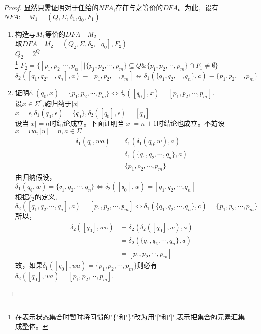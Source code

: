 \begin{proof}
	显然只需证明对于任给的$NFA$,存在与之等价的$DFA$。为此，设有$NFA:\quad M_1=(Q,\Sigma,\delta_1,q_0,F_1)$
	\begin{enumerate}
		\item 构造与$M_1$等价的$DFA\quad M_2$\\
		取$DFA\quad M_2=(Q_2,\Sigma,\delta_2,[q_0],F_2)$\\
		$Q_2=2^Q$\\
		\footnote[1]{在表示状态集合时暂时将习惯的"\{"和"\}"改为用"["和"]",表示把集合的元素汇集成整体。}
		$F_2=\{[p_1,p_2,\cdots,p_m]|\{p_1,p_2,\cdots,p_m\}\subseteq Q \& \{p_1,p_2,\cdots,p_m\}\cap F_1\ne\emptyset\}$\\
		$\delta_2([q_1,q_2,\cdots,q_n],a)=[p_1,p_2,\cdots,p_m] \Leftrightarrow
		\delta_1(\{q_1,q_2,\cdots,q_n\},a)=\{p_1,p_2,\cdots,p_m\}$
		
		\item[\label{delta_2}] 证明$\delta_1(q_0,x)=\{p_1,p_2,\cdots,p_m\}\Leftrightarrow\delta_2([q_0],x)=[p_1,p_2,\cdots,p_m]$.\\
		设$x\in\Sigma^\ast$,施归纳于$|x|$\\
		$x=\epsilon,\delta_1(q_0,\epsilon)=\{q_0\},\delta_2([q_0],\epsilon)=[q_0]$\\
		设当$|x|=n$时结论成立。下面证明当$|x|=n+1$时结论也成立。不妨设$x=wa,|w|=n,a\in\Sigma$
		\begin{align*}
		\delta_1(q_0,wa) &=\delta_1(\delta_1(q_0,w),a)\\
		&= \delta_1(\{q_1,q_2,\cdots,q_n\},a)\\
		&= \{p_1,p_2,\cdots,p_m\}
		\end{align*}
		由归纳假设，\\
		$\delta_1(q_0,w)=\{q_1,q_2,\cdots,q_n\}\Leftrightarrow\delta_2([q_0],w)=[q_1,q_2,\cdots,q_n]$\\
		根据$\delta_2$的定义, \\
		$\delta_2([q_1,q_2,\cdots,q_n],a)=[p_1,p_2,\cdots,p_m]\Leftrightarrow\delta_1(\{q_1,q_2,\cdots,q_n\},a)=\{p_1,p_2,\cdots,p_m\}$\\
		所以，
		\begin{align*}
		\delta_2([q_0],wa) &=\delta_2(\delta_2([q_0],w),a)\\
		&= \delta_2(\{q_1,q_2,\cdots,q_n\},a)\\
		&= [p_1,p_2,\cdots,p_m]
		\end{align*}
		故，如果$\delta_1([q_0],wa)=\{p_1,p_2,\cdots,p_m\}$则必有$\delta_2([q_0],wa)=[p_1,p_2,\cdots,p_m]$.
		

\end{enumerate}
\end{proof}
